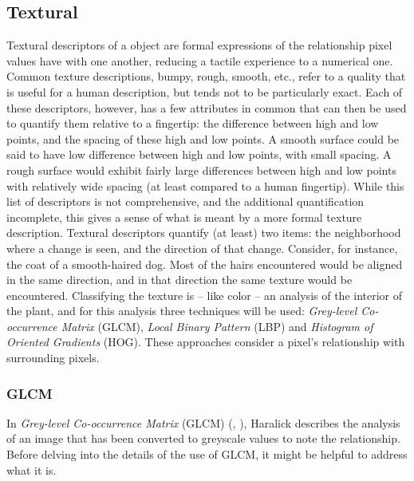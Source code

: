\documentclass[letterpaper]{article}
\begin{document}
{\subsection{Textural}
Textural descriptors of a object are formal expressions of the relationship pixel values have with one another, reducing a tactile experience to a numerical one. Common texture descriptions, bumpy, rough, smooth, etc., refer to a quality that is useful for a human description, but tends not to be particularly exact. Each of these descriptors, however, has a few attributes in common that can then be used to quantify them relative to a fingertip: the difference between high and low points, and the spacing of these high and low points. A smooth surface could be said to have low difference between high and low points, with small spacing. A rough surface would exhibit fairly large differences between high and low points with relatively wide spacing (at least compared to a human fingertip). While this list of descriptors is not comprehensive, and the additional quantification incomplete, this gives a sense of what is meant by a more formal texture description. Textural descriptors quantify (at least) two items: the neighborhood where a change is seen, and the direction of that change. Consider, for instance, the coat of a smooth-haired dog. Most of the hairs encountered would be aligned in the same direction, and in that direction the same texture would be encountered.
Classifying the texture is -- like color -- an analysis of the interior of the plant, and for this analysis three techniques will be used:  \textit{Grey-level Co-occurrence Matrix} (GLCM), \textit{Local Binary Pattern} (LBP) and \textit{Histogram of Oriented Gradients} (HOG). These approaches consider a pixel's relationship with surrounding pixels.

\subsubsection{GLCM}
In \textit{Grey-level Co-occurrence Matrix} (GLCM) (\cite{Haralick1973-gr}, \cite{Hall-Beyer2017-nx}), Haralick describes the analysis of an image that has been converted to greyscale values to note the relationship. Before delving into the details of the use of GLCM, it might be helpful to address what it is.

}
\end{document}
